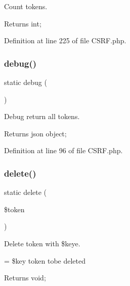Count tokens.

\begin{DoxyReturn}{Returns}
int; 
\end{DoxyReturn}


Definition at line 225 of file C\+S\+R\+F.\+php.

\mbox{\label{class_zest_1_1_c_s_r_f_1_1_c_s_r_f_a6f94454961915eeb8ddf6bf0286392c3}} 
\subsubsection{\texorpdfstring{debug()}{debug()}}
{\footnotesize\ttfamily static debug (\begin{DoxyParamCaption}{ }\end{DoxyParamCaption})\hspace{0.3cm}{\ttfamily [static]}}

Debug return all tokens.

\begin{DoxyReturn}{Returns}
json object; 
\end{DoxyReturn}


Definition at line 96 of file C\+S\+R\+F.\+php.

\mbox{\label{class_zest_1_1_c_s_r_f_1_1_c_s_r_f_a47cd58cb7dbe9901bd4a4b4c6d75d288}} 
\subsubsection{\texorpdfstring{delete()}{delete()}}
{\footnotesize\ttfamily static delete (\begin{DoxyParamCaption}\item[{}]{\$token }\end{DoxyParamCaption})\hspace{0.3cm}{\ttfamily [static]}}

Delete token with \$keye.

= \$key token tobe deleted

\begin{DoxyReturn}{Returns}
void; 
\end{DoxyReturn}


